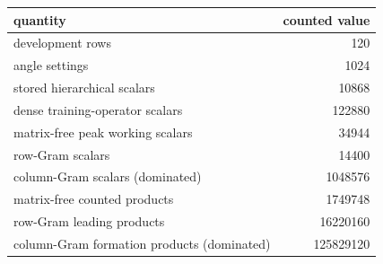 \begin{tabular}{lr}
\toprule
quantity & counted value\\
\midrule
development rows & 120\\
angle settings & 1024\\
stored hierarchical scalars & 10868\\
dense training-operator scalars & 122880\\
matrix-free peak working scalars & 34944\\
row-Gram scalars & 14400\\
column-Gram scalars (dominated) & 1048576\\
matrix-free counted products & 1749748\\
row-Gram leading products & 16220160\\
column-Gram formation products (dominated) & 125829120\\
\bottomrule
\end{tabular}
